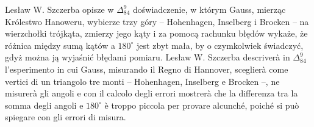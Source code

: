 Lesław W. Szczerba opisze w $\Delta_{84}^{9}$ doświadczenie, w którym Gauss, mierząc Królestwo Hanoweru, wybierze trzy góry -- Hohenhagen, Inselberg i Brocken -- na wierzchołki trójkąta, zmierzy jego kąty i za pomocą rachunku błędów wykaże, że różnica między sumą kątów a $180^\circ$ jest zbyt mała, by o czymkolwiek świadczyć, gdyż można ją wyjaśnić błędami pomiaru. %
Lesław W. Szczerba descriverà in $\Delta_{84}^{9}$ l'esperimento in cui Gauss, misurando il Regno di Hannover, sceglierà come vertici di un triangolo tre monti -- Hohenhagen, Inselberg e Brocken --, ne misurerà gli angoli e con il calcolo degli errori mostrerà che la differenza tra la somma degli angoli e $180^\circ$ è troppo piccola per provare alcunché, poiché si può spiegare con gli errori di misura. %


